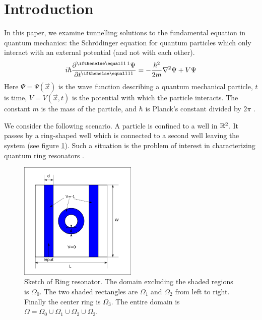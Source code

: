 \documentclass[../../main.tex]{subfiles}
\begin{document}
\section{Introduction}

In this paper, we examine tunnelling solutions to the 
fundamental equation in quantum mechanics: the Schr\"odinger equation
for quantum particles which only interact with an external potential (and not 
with each other).
\begin{equation}
		\label{eq:schrodinger}
		i \hbar \pder{\Psi}{t} = -\frac{\hbar^2}{2m} \nabla^2 \Psi + 
		V \Psi
\end{equation}
Here $\Psi = \Psi(\vec x)$ is the wave function describing a 
quantum mechanical particle, $t$ is time, 
$V = V(\vec x, t)$ is the potential with which the particle 
interacts.  The constant $m$ is the mass of the particle,
and $\hbar$ is Planck's constant divided by $2\pi$ 
\cite{griffiths-quantum}.  

We consider the following scenario. 
A particle is confined to a well in $\mathbb{R}^2$.  
It passes by a ring-shaped well which is connected to a 
second well leaving the system
(see figure \ref{fig:system-sketch}).
Such a situation is the problem of interest in characterizing
quantum ring resonators \cite{spp-ring-resonator, cancer-detection, diagnostics}.

\begin{figure}[h]
		\centering
		\includegraphics[width=0.5\textwidth]{system-sketch.png}
		\caption{Sketch of Ring resonator. 
		The domain excluding the shaded regions is $\Omega_0$. 
		The two shaded rectangles are $\Omega_1$ and $\Omega_2$ from
		left to right.  Finally the center ring is 
		$\Omega_3$.  
		The entire domain is $\Omega = \Omega_0 \cup \Omega_1 \cup 
		\Omega_2 \cup \Omega_3.$}
		\label{fig:system-sketch}
\end{figure}
\end{document}
